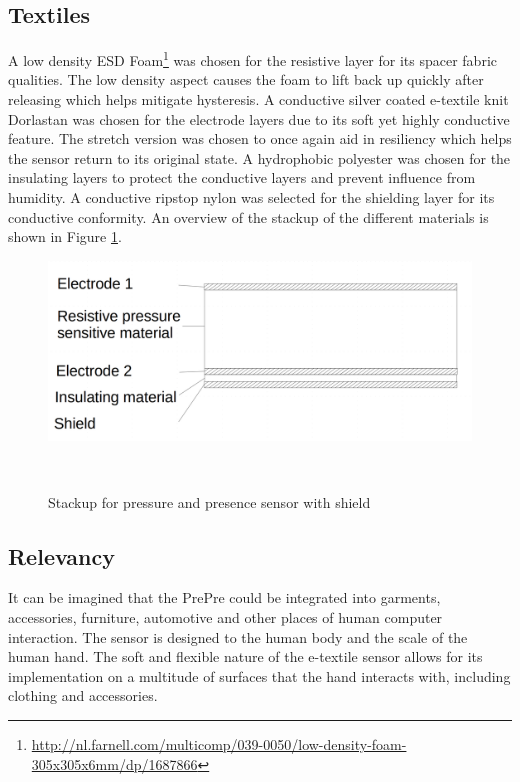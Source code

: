 \documentclass{sigchi-ext}
\begin{document}
\subsection{Textiles}
A low density ESD Foam\footnote{\url{http://nl.farnell.com/multicomp/039-0050/low-density-foam-305x305x6mm/dp/1687866}} was chosen for the resistive layer for its spacer fabric qualities.  The low density aspect causes the foam to lift back up quickly after releasing which helps mitigate hysteresis. A conductive silver coated e-textile knit Dorlastan was chosen for the electrode layers due to its soft yet highly conductive feature. The stretch version was chosen to once again aid in resiliency which helps the sensor return to its original state.  A hydrophobic polyester was chosen for the insulating layers to protect the conductive layers and prevent influence from humidity.  A conductive ripstop nylon was selected for the shielding layer for its conductive conformity. An overview of the stackup of the different materials is shown in Figure \ref{fig:stackup}.


\begin{figure}[!htbp]
\centering
  \includegraphics[trim={0 2cm 0 2cm},clip,width=0.9\columnwidth]{figures/stackup}
  \caption{Stackup for pressure and presence sensor with
shield}~\label{fig:stackup}
\end{figure}

\subsection{Relevancy}
It can be imagined that the PrePre could be integrated into garments, accessories, furniture, automotive and other places of human computer interaction.  The sensor is designed to the human body and the scale of the human hand.  The soft and flexible nature of the e-textile sensor allows for its implementation on a multitude of surfaces that the hand interacts with, including clothing and accessories. 
\end{document}
